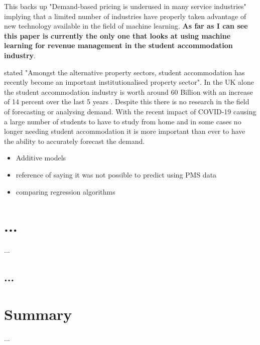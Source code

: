 This backs up "Demand-based pricing is underused in many service industries" \cite{Kimes2003HasAcceptable} implying that a limited number of industries have properly taken advantage of new technology available in the field of machine learning. \textbf{As far as I can see this paper is currently the only one that looks at using machine learning for revenue management in the student accommodation industry}. 

\vspace{5mm}

\cite{Newell2018TheSector} stated "Amongst the alternative property sectors, student accommodation has recently become an important institutionalised property sector". In the UK alone the student accommodation industry is worth around 60 Billion \cite{UKWakefield} with an increase of 14 percent over the last 5 years \cite{UKWakefield}. Despite this there is no research in the field of forecasting or analysing demand. With the recent impact of COVID-19 causing a large number of students to have to study from home and in some cases no longer needing student accommodation it is more important than ever to have the ability to accurately forecast the demand. 



\vspace{5mm}

\begin{itemize}
\item Additive models

\item reference of saying it was not possible to predict using PMS data
\item comparing regression algorithms
\end{itemize}





\section{...}
...


\subsection{...}


\section{Summary}
...


